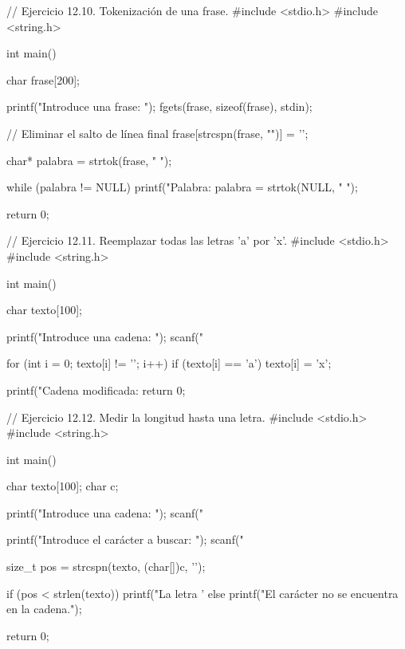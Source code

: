 // Ejercicio 12.10. Tokenización de una frase.
#include <stdio.h>
#include <string.h>

int main() {
   char frase[200];
   
   printf("Introduce una frase: ");
   fgets(frase, sizeof(frase), stdin);
   
   // Eliminar el salto de línea final
   frase[strcspn(frase, "\n")] = '\0';
   
   char* palabra = strtok(frase, " ");
   
   while (palabra != NULL) {
      printf("Palabra: %
      palabra = strtok(NULL, " ");
   }
   
   return 0;
}




// Ejercicio 12.11. Reemplazar todas las letras 'a' por 'x'.
#include <stdio.h>
#include <string.h>

int main() {
   char texto[100];
   
   printf("Introduce una cadena: ");
   scanf("%
   
   for (int i = 0; texto[i] != '\0'; i++) {
      if (texto[i] == 'a') {
         texto[i] = 'x';
      }
   }
   
   printf("Cadena modificada: %
   return 0;
}




// Ejercicio 12.12. Medir la longitud hasta una letra.
   #include <stdio.h>
   #include <string.h>
   
   int main() {
      char texto[100];
      char c;
      
      printf("Introduce una cadena: ");
      scanf("%
      
      printf("Introduce el carácter a buscar: ");
      scanf(" %
      
      size_t pos = strcspn(texto, (char[]){c, '\0'});
      
      if (pos < strlen(texto)) {
         printf("La letra '%
      } else {
         printf("El carácter no se encuentra en la cadena.\n");
      }
      
      return 0;
   }

